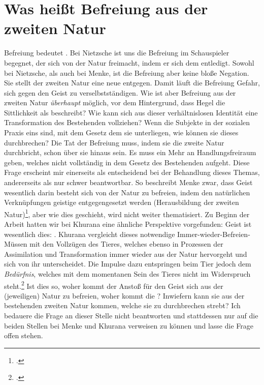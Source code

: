 \documentclass[12pt, a4paper, openany]{report}
\begin{document}
\section{Was heißt Befreiung aus der zweiten Natur}\label{abschnitt_3}
Befreiung bedeutet .
Bei Nietzsche ist uns die Befreiung im Schauspieler begegnet, der sich von der Natur freimacht, indem er sich dem  entledigt.
Sowohl bei Nietzsche, als auch bei Menke, ist die Befreiung aber keine bloße Negation. 
Sie stellt der  zweiten Natur eine neue entgegen.
Damit läuft die Befreiung Gefahr, sich gegen den Geist zu verselbstständigen. 
Wie ist aber Befreiung aus der zweiten Natur \emph{überhaupt} möglich, vor dem Hintergrund, dass Hegel die Sittlichkeit als  beschreibt?
Wie kann sich aus dieser verhältnislosen Identität eine Transformation des Bestehenden vollziehen?
Wenn die Subjekte in der sozialen Praxis eins sind, mit dem Gesetz dem sie unterliegen, wie können sie dieses durchbrechen? 
Die Tat der Befreiung muss, indem sie die zweite Natur durchbricht, schon über sie hinaus sein.
Es muss ein Mehr an Handlungsfreiraum geben, welches nicht vollständig in dem Gesetz des Bestehenden aufgeht.
Diese Frage erscheint mir einerseits als entscheidend bei der Behandlung dieses Themas, andererseits als nur schwer beantwortbar.
So beschreibt Menke zwar, dass Geist wesentlich darin besteht sich von der Natur zu befreien, indem den natürlichen Verknüpfungen geistige entgegengesetzt werden (Herausbildung der zweiten Natur)\footcite[Vgl.][39]{menke_autonomie_2018}, aber wie dies geschieht, wird nicht weiter thematisiert. 
Zu Beginn der Arbeit hatten wir bei Khurana eine ähnliche Perspektive vorgefunden: Geist ist wesentlich dies: . 
Khurana vergleicht dieses notwendige Immer-wieder-Befreien-Müssen mit den Vollzügen des Tieres, welches ebenso in Prozessen der Assimilation und Transformation immer wieder aus der Natur hervorgeht und sich von ihr unterscheidet.
Die Impulse dazu entspringen beim Tier jedoch dem \emph{Bedürfnis}, welches mit dem momentanen Sein des Tieres nicht im Widerspruch steht.\footcite[Vgl.][S. 342ff.]{khurana_freiheit_2017}
Ist dies so, woher kommt der Anstoß für den Geist sich aus der (jeweiligen) Natur zu befreien, woher kommt die ?
Inwiefern kann sie aus der bestehenden zweiten Natur kommen, welche sie zu durchbrechen strebt? 
Ich bedauere die Frage an dieser Stelle nicht beantworten und stattdessen nur auf die beiden Stellen bei Menke und Khurana verweisen zu können und lasse die Frage offen stehen.
\end{document}
